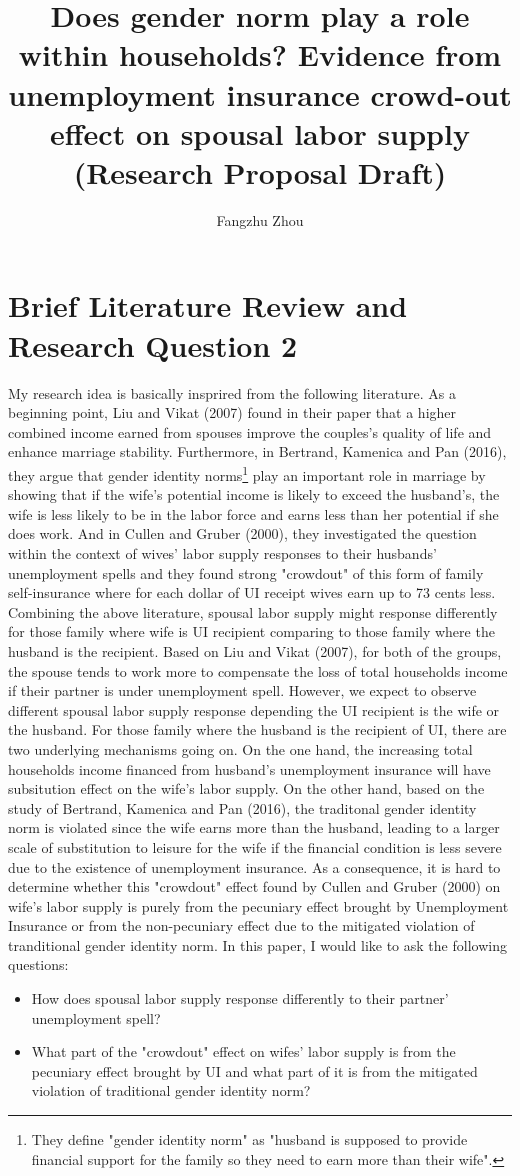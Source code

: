 \documentclass[legalpaper,12pt,margin=1in]{article}
\title{Does gender norm play a role within households? Evidence from unemployment insurance crowd-out effect on spousal labor supply (Research Proposal Draft)}
\author{Fangzhu Zhou}
\begin{document}
\maketitle
\section{Brief Literature Review and Research Question 2}
My research idea is basically insprired from the following literature. As a beginning point, Liu and Vikat (2007) found in their paper that a higher combined income earned from spouses improve the couples's quality of life and enhance marriage stability. Furthermore, in Bertrand, Kamenica and Pan (2016), they argue that gender identity norms\footnote{They define "gender identity norm" as "husband is supposed to provide financial support for the family so they need to earn more than their wife".} play an important role in marriage by showing that if the wife's potential income is likely to exceed the husband's, the wife is less likely to be in the labor force and earns less than her potential if she does work. And in Cullen and Gruber (2000), they investigated the question within the context of wives' labor supply responses to their husbands' unemployment spells and they found strong "crowdout" of this form of family self-insurance where for each dollar of UI receipt wives earn up to 73 cents less. Combining the above literature, spousal labor supply might response differently for those family where wife is UI recipient comparing to those family where the husband is the recipient. Based on Liu and Vikat (2007), for both of the groups, the spouse tends to work more to compensate the loss of total households income if their partner is under unemployment spell. However, we expect to observe different spousal labor supply response depending the UI recipient is the wife or the husband. For those family where the husband is the recipient of UI, there are two underlying mechanisms going on. On the one hand, the increasing total households income financed from husband's unemployment insurance will have subsitution effect on the wife's labor supply. On the other hand, based on the study of Bertrand, Kamenica and Pan (2016), the traditonal gender identity norm is violated since the wife earns more than the husband, leading to a larger scale of substitution to leisure for the wife if the financial condition is less severe due to the existence of unemployment insurance. As a consequence, it is hard to determine whether this "crowdout" effect found by Cullen and Gruber (2000) on wife's labor supply is purely from the pecuniary effect brought by Unemployment Insurance or from the non-pecuniary effect due to the mitigated violation of tranditional gender identity norm. In this paper, I would like to ask the following questions:
\begin{itemize}
\item How does spousal labor supply response differently to their partner' unemployment spell?
\item What part of the "crowdout" effect on wifes' labor supply is from the pecuniary effect brought by UI and what part of it is from the mitigated violation of traditional gender identity norm?
\end{itemize}
\end{document}
